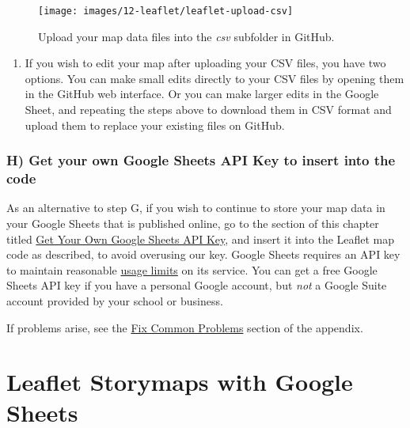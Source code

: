 \documentclass[
  english,
]{book}
\providecommand{\tightlist}{%
  \setlength{\itemsep}{0pt}\setlength{\parskip}{0pt}}
\begin{document}
\begin{figure}
\texttt{[image: images/12-leaflet/leaflet-upload-csv]} \caption{Upload your map data files into the \emph{csv} subfolder in GitHub.}\label{fig:leaflet-upload-csv}
\end{figure}

\begin{enumerate}
\def\labelenumi{\arabic{enumi}.}
\setcounter{enumi}{3}
\tightlist
\item
  If you wish to edit your map after uploading your CSV files, you have two options. You can make small edits directly to your CSV files by opening them in the GitHub web interface. Or you can make larger edits in the Google Sheet, and repeating the steps above to download them in CSV format and upload them to replace your existing files on GitHub.
\end{enumerate}

\hypertarget{h-get-your-own-google-sheets-api-key-to-insert-into-the-code}{%
\subsubsection*{H) Get your own Google Sheets API Key to insert into the code}\label{h-get-your-own-google-sheets-api-key-to-insert-into-the-code}}

As an alternative to step G, if you wish to continue to store your map data in your Google Sheets that is published online, go to the section of this chapter titled \href{google-sheets-api-key.html}{Get Your Own Google Sheets API Key}, and insert it into the Leaflet map code as described, to avoid overusing our key. Google Sheets requires an API key to maintain reasonable \href{https://developers.google.com/sheets/api/limits}{usage limits} on its service. You can get a free Google Sheets API key if you have a personal Google account, but \emph{not} a Google Suite account provided by your school or business.

If problems arise, see the \href{fix.html}{Fix Common Problems} section of the appendix.

\hypertarget{leaflet-storymaps-with-google-sheets}{%
\section*{Leaflet Storymaps with Google Sheets}\label{leaflet-storymaps-with-google-sheets}}
\end{document}
